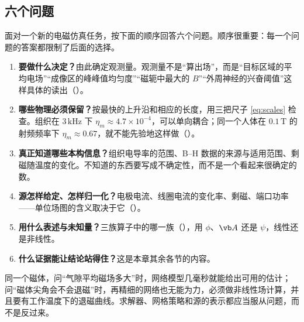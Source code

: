 \subsection{六个问题}
面对一个新的电磁仿真任务，按下面的顺序回答六个问题。顺序很重要：每一个问题的答案都限制了后面的选择。
\begin{enumerate}
\item \textbf{要做什么决定？}由此确定观测量。观测量不是“算出场”，而是“目标区域的平均电场”“成像区的峰峰值均匀度”“磁轭中最大的 $B$”“外周神经的兴奋阈值”这样具体的读出（）。
\item \textbf{哪些物理必须保留？}按最快的上升沿和相应的长度，用三把尺子 \eqref{eq:scales} 检查。组织在 $3\,\mathrm{kHz}$ 下 $\eta_m\approx4.7\times10^{-4}$，可以单向耦合；同一个人体在 $0.1\,\mathrm T$ 的射频频率下 $\eta_m\approx0.67$，就不能先验地这样做（）。
\item \textbf{真正知道哪些本构信息？}组织电导率的范围、B--H 数据的来源与适用范围、剩磁随温度的变化。不知道的东西要写成不确定性，而不是一个看起来很确定的数。
\item \textbf{源怎样给定、怎样归一化？}电极电流、线圈电流的变化率、剩磁、端口功率——单位场图的含义取决于它（）。
\item \textbf{用什么表述与未知量？}三族算子中的哪一族（），用 $\phi$、$\vb A$ 还是 $\psi$，线性还是非线性。
\item \textbf{什么证据能让结论站得住？}这是本章其余各节的内容。
\end{enumerate}

\begin{intuition}
同一个磁体，问“气隙平均磁场多大”时，网络模型几毫秒就能给出可用的估计；问“磁体尖角会不会退磁”时，再精细的网络也无能为力，必须做非线性场计算，并且要有工作温度下的退磁曲线。求解器、网格策略和源的表示都应当服从问题，而不是反过来。
\end{intuition}

